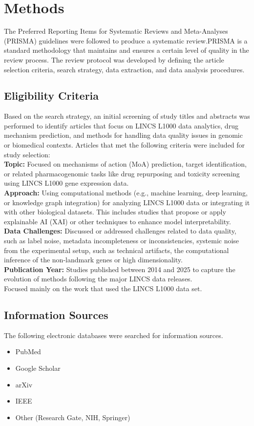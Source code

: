 \documentclass[twocolumn]{article}
\begin{document}
\section{Methods}
The Preferred Reporting Items for Systematic Reviews and Meta-Analyses (PRISMA) guidelines were followed to produce a systematic review\cite{page2021prisma}.\linebreak PRISMA is a standard methodology that maintains and ensures a certain level of quality in the review process. The review protocol was developed by defining the article selection criteria, search strategy, data extraction, and data analysis procedures.
\subsection{Eligibility Criteria}\label{subsec:Eligibility Criteria}
Based on the search strategy, an initial screening of study titles and abstracts was performed to identify articles that focus on LINCS L1000 data analytics, drug mechanism prediction, and methods for handling data quality issues in genomic or biomedical contexts. Articles that met the following criteria were included for study selection: 
\\
\textbf{Topic: }Focused on mechanisms of action (MoA) prediction, target identification, or related pharmacogenomic tasks like drug repurposing and toxicity screening using LINCS L1000 gene expression data.
\\
\textbf{Approach: }Using computational methods (e.g., machine learning, deep learning, or knowledge graph integration) for analyzing LINCS L1000 data or integrating it with other biological datasets. This includes studies that propose or apply explainable AI (XAI) or other techniques to enhance model interpretability.
\\
\textbf{Data Challenges: }Discussed or addressed challenges related to data quality, such as label noise, metadata incompleteness or inconsistencies, systemic noise from the experimental setup, such as technical artifacts, the computational inference of the non-landmark genes or high dimensionality.
\\
\textbf{Publication Year: }Studies published between 2014 and 2025 to capture the evolution of methods following the major LINCS data releases.
\\
Focused mainly on the work that used the LINCS L1000 data set. 
\subsection{Information Sources}
The following electronic databases were searched for information sources.
\begin{itemize}
    \item PubMed
    \item Google Scholar
    \item arXiv
    \item IEEE
    \item Other (Research Gate, NIH, Springer)
\end{itemize}
\end{document}
